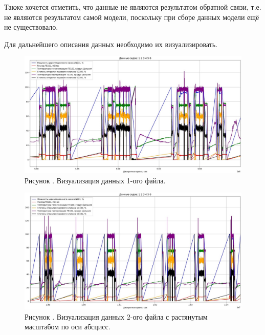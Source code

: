 {  \par \redline Также хочется отметить, что данные не являются результатом обратной связи, т.е. не являются результатом самой модели, поскольку при сборе данных модели ещё не существовало.

  \par \redline Для дальнейшего описания данных необходимо их визуализировать. 

  \begin{figure}
    \centering
    \def\svgwidth{\textwidth}
    \includegraphics[scale=0.6]{images/data_1_visual.jpg}
    \caption*{\gostFont Рисунок \thechaptercntr .\theimagecntr \spc {--} Визуализация данных 1-ого файла.}
    \label{fig:Data1Visual}
  \end{figure} \addtocounter{imagecntr}{1}

  \begin{figure}
    \centering
    \def\svgwidth{\textwidth}
    \includegraphics[scale=0.6]{images/data_2_visual.jpg}
    \caption*{\gostFont Рисунок \thechaptercntr .\theimagecntr \spc {--} Визуализация данных 2-ого файла с растянутым масштабом по оси абсцисс.}
    \label{fig:Data2Visual}
  \end{figure} \addtocounter{imagecntr}{1}

}
